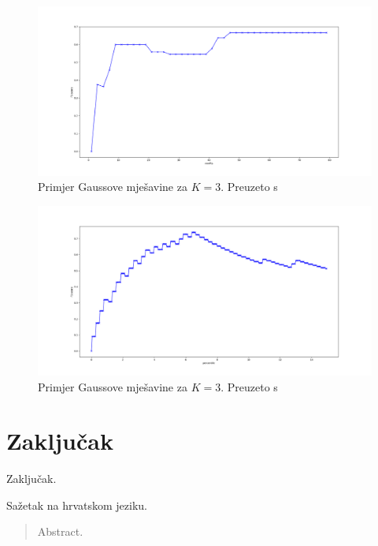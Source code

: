 \documentclass[utf8, diplomski, numeric]{fer}
\begin{document}
\begin{figure}[htb]
\includegraphics[width=1\textwidth]{images/cancer-dbscan-f1.png}
\centering
\caption{Primjer Gaussove mješavine za $K = 3$. Preuzeto s  \cite{GaussianMixtureExplained}}
\label{fig:cancer-dbscan}
\end{figure}

\begin{figure}[htb]
\includegraphics[width=1\textwidth]{images/cancer-gauss-f1.png}
\centering
\caption{Primjer Gaussove mješavine za $K = 3$. Preuzeto s  \cite{GaussianMixtureExplained}}
\label{fig:cancer-gauss}
\end{figure}

\chapter{Zaključak}
Zaključak.

\nocite{*}



\begin{sazetak}
Sažetak na hrvatskom jeziku.

\end{sazetak}

\begin{abstract}
Abstract.

\end{abstract}
\end{document}
